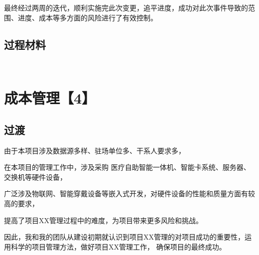 \documentclass[UTF8]{../computerUniverse}
\begin{document}
最终经过两周的迭代，顺利实施完此次变更，追平进度，成功对此次事件导致的范围、进度、成本等多方面的风险进行了有效控制。









\section{过程材料}
\begin{lstlisting}


\end{lstlisting}










\chapter{成本管理【4】}

\section{过渡}

由于本项目涉及数据源多样、驻场单位多、干系人要求多，

在本项目的管理工作中，涉及采购
医疗自助智能一体机、智能卡系统、服务器、交换机等硬件设备，

广泛涉及物联网、智能穿戴设备等嵌入式开发，对硬件设备的性能和质量方面有较高的要求，

提高了项目XX管理过程中的难度，为项目带来更多风险和挑战。

因此，我和我的团队从建设初期就认识到项目XX管理的对项目成功的重要性，运用科学的项目管理方法，做好项目XX管理工作，
确保项目的最终成功。
\end{document}
